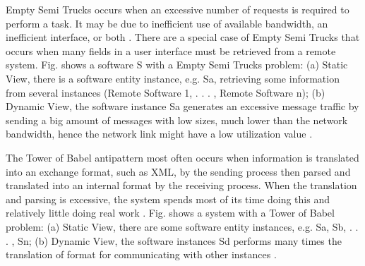 \documentclass[times]{stvrauth}
\begin{document}
Empty Semi Trucks occurs when an excessive number of requests is required to perform a task. It may be due to inefficient use of available bandwidth, an inefficient interface, or both \cite{Arcelli2012}. There are a special case of Empty Semi Trucks that occurs  when many fields in a user interface must be retrieved from a
remote system. Fig. shows a software S with a Empty Semi Trucks problem: (a) Static View, there is a software entity instance, e.g. Sa, retrieving some information from several instances (Remote Software 1, . . . , Remote Software n); (b) Dynamic View, the software instance Sa generates an excessive message traffic by sending a big amount of messages with low sizes, much lower than the network bandwidth, hence the network link might have a low utilization value \cite{Vetoio2011}.

The Tower of Babel antipattern most often occurs when information is translated into an exchange format, such as XML, by the sending process then parsed and translated into an
internal format by the receiving process. When the translation and parsing is excessive, the system spends most
of its time doing this and relatively little doing real work \cite{Smith2003}. Fig. shows a system with a Tower of Babel problem: (a) Static View, there are some software entity instances, e.g. Sa, Sb, . . . , Sn; (b) Dynamic View, the software instances Sd performs many times the translation of format for communicating with other instances \cite{Vetoio2011}.
\end{document}
